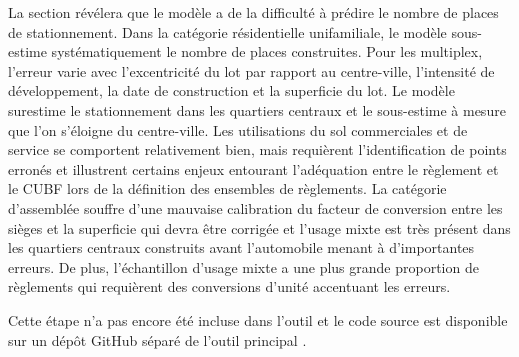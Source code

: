 La section révélera que le modèle a de la difficulté à prédire le nombre de places de stationnement. Dans la catégorie résidentielle unifamiliale, le modèle sous-estime systématiquement le nombre de places construites. Pour les multiplex, l'erreur varie avec l'excentricité du lot par rapport au centre-ville, l'intensité de développement, la date de construction et la superficie du lot. Le modèle surestime le stationnement dans les quartiers centraux et le sous-estime à mesure que l'on s'éloigne du centre-ville. Les utilisations du sol commerciales et de service se comportent relativement bien, mais requièrent l'identification de points erronés et illustrent certains enjeux entourant l'adéquation entre le règlement et le \ac{CUBF} lors de la définition des ensembles de règlements. La catégorie d'assemblée souffre d'une mauvaise calibration du facteur de conversion entre les sièges et la superficie qui devra être corrigée et l'usage mixte est très présent dans les quartiers centraux construits avant l'automobile menant à d'importantes erreurs. De plus, l'échantillon d'usage mixte a une plus grande proportion de règlements qui requièrent des conversions d'unité accentuant les erreurs.\par
Cette étape n'a pas encore été incluse dans l'outil et le code source est disponible sur un dépôt GitHub séparé de l'outil principal \parencite{charbonneau_epmpaulpolyerror_propagation_2025}.
